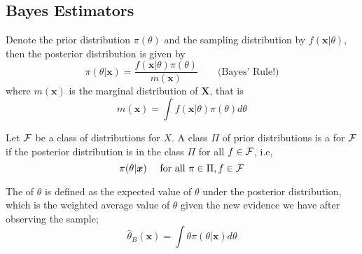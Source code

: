 \subsection{Bayes Estimators}
Denote the prior distribution $\pi(\theta)$ and the sampling distribution by $f(\boldsymbol{x}|\theta)$, then the posterior distribution is given by 
$$
\pi(\theta|\boldsymbol{x}) = \frac{f(\boldsymbol{x}|\theta)\pi(\theta)}{m(\boldsymbol{x})} \quad 
\quad \text{(Bayes' Rule!)}
$$
where $m(\boldsymbol{x})$ is the marginal distribution of $\boldsymbol{X}$, that is 
$$
    m(\boldsymbol{x}) = \int f(\boldsymbol{x}|\theta)\pi(\theta)d\theta
$$

\begin{definition}
    Let $\mathcal F$ be a class of distributions for $X$. A class $\Pi$ of prior distributions is a  for $\mathcal F$ if the posterior distribution is in the class $\Pi$ for all $f \in \mathcal F$, i.e,
    $$
    \pi(\theta|\boldsymbol{x})\quad \text{ for all } \pi \in \Pi, f \in \mathcal F
    $$
\end{definition}

The  of $\theta$ is defined as the expected value of $\theta$ under the posterior distribution, which is the weighted average value of $\theta$ given the new evidence we have after observing the sample;
$$
\hat{\theta}_{B}(\boldsymbol{x}) = \int \theta \pi (\theta|\boldsymbol{x})d\theta 
$$